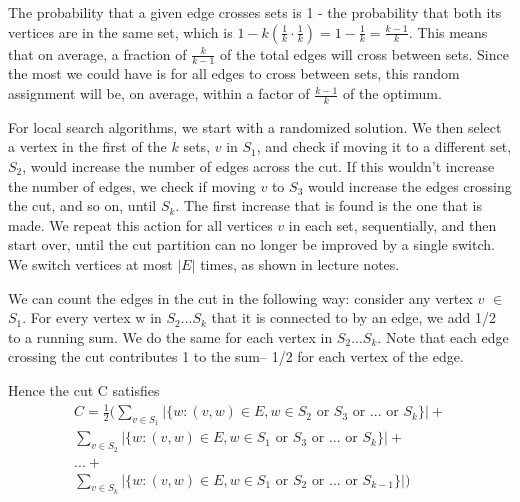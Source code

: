 \documentclass[11pt]{article}
\begin{document}
The probability that a given edge crosses sets is 1 - the probability that both its vertices are in the same set, which is $1- k(\frac{1}{k}\cdot\frac{1}{k})= 1 - \frac{1}{k} = \frac{k-1}{k}$. This means that on average, a fraction of $\frac{k}{k-1}$ of the total edges will cross between sets. Since the most we could have is for all edges to cross between sets, this random assignment will be, on average, within a factor of $\frac{k-1}{k}$ of the optimum.

For local search algorithms, we start with a randomized solution. We then select a vertex in the first of the $k$ sets, $v$ in $S_1$, and check if moving it to a different set, $S_2$, would increase the number of edges across the cut. If this wouldn't increase the number of edges, we check if moving $v$ to $S_3$ would increase the edges crossing the cut, and so on, until $S_k$. The first increase that is found is the one that is made. We repeat this action for all vertices $v$ in each set, sequentially, and then start over, until the cut partition can no longer be improved by a single switch. We switch vertices at most $|E|$ times, as shown in lecture notes. 

We can count the edges in the cut in the following way: consider any vertex $v$ $\in$ $S_1$. For every vertex w in $S_2...S_k$ that it is connected to by an edge, we add 1/2 to a running sum. We do the same for each vertex in $S_2...S_k$. Note that each edge crossing the cut contributes 1 to the sum– 1/2 for each vertex of the edge.

Hence the cut C satisfies
\begin{multline*}
	C= \frac{1}{2} (\sum_{v\in S_1}|\{w:(v,w)\in E, w \in S_2 \text{ or } S_3 \text{ or } ... \text{ or } S_k\}|+ \\
	\sum_{v\in S_2}|\{w:(v,w) \in E, w \in S_1\text{ or } S_3 \text{ or } ... \text{ or } S_k\}| + \\
	... + \\ 
	\sum_{v\in S_k}|\{w:(v,w) \in E, w \in S_1\text{ or } S_2 \text{ or } ... \text{ or } S_{k-1}\}|)
\end{multline*}
\end{document}
